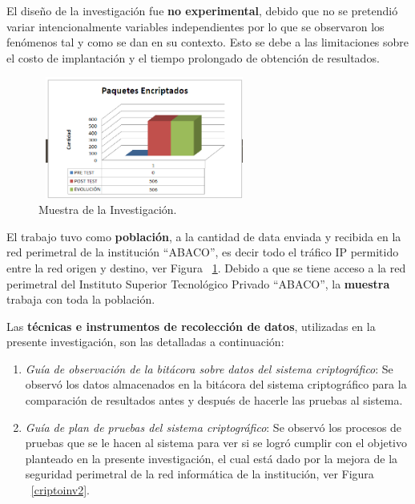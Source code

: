 \documentclass[10pt,journal]{IEEEtran}
\begin{document}
\begin{itemize}
        El diseño de la investigación fue \textbf{no experimental}, debido que no se pretendió variar intencionalmente variables independientes por lo que se observaron los fenómenos tal y como se dan en su contexto. Esto se debe a las limitaciones sobre el costo de implantación y el tiempo prolongado de obtención de resultados.
        
    \begin{figure}[H]
      \begin{center}
        \includegraphics[width=7cm, height=4cm]{figuras/criptoinv3.PNG}
        \caption{Muestra de la Investigación.}
        \label{criptoinv3} 
        \end{center}
    \end{figure}
        
        El trabajo tuvo como \textbf{población}, a la cantidad de data enviada y recibida en la red perimetral de la institución “ABACO”, es decir todo el tráfico IP permitido entre la red origen y destino, ver Figura ~\ref{criptoinv3}. Debido a que se tiene acceso a la red perimetral del Instituto Superior Tecnológico Privado “ABACO”, la \textbf{muestra} trabaja con toda la población.
        
        Las \textbf{técnicas e instrumentos de recolección de datos}, utilizadas en la presente investigación, son las detalladas a continuación:
        \begin{enumerate}
        \item \textit{Guía de observación de la bitácora sobre datos del sistema criptográfico}: Se observó los datos almacenados en la bitácora del sistema criptográfico para la comparación de resultados antes y después de hacerle las pruebas al sistema.
        \item \textit{Guía de plan de pruebas del sistema criptográfico}: Se observó los procesos de pruebas que se le hacen al sistema para ver si se logró cumplir con el objetivo planteado en la presente investigación, el cual está dado por la mejora de la seguridad perimetral de la red informática de la institución, ver Figura ~\ref{criptoinv2}.
        \end{enumerate}


\end{itemize}
\end{document}
